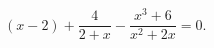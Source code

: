 \begin{ex}[type=equation]
	\begin{condition}
		$(x - 2) + \dfrac{4}{2 + x} - \dfrac{x^3 + 6}{x^2 + 2x} = 0.$
	\end{condition}
\end{ex}